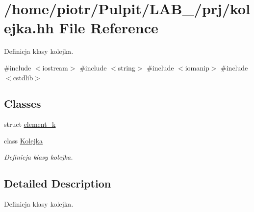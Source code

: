 \hypertarget{kolejka_8hh}{\section{/home/piotr/\-Pulpit/\-L\-A\-B\-\_/prj/kolejka.hh \-File \-Reference}
\label{kolejka_8hh}
}


\-Definicja klasy kolejka.  


{\ttfamily \#include $<$iostream$>$}\*
{\ttfamily \#include $<$string$>$}\*
{\ttfamily \#include $<$iomanip$>$}\*
{\ttfamily \#include $<$cstdlib$>$}\*
\subsection*{\-Classes}
\begin{DoxyCompactItemize}
\item 
struct \hyperlink{structelement__k}{element\-\_\-k}
\item 
class \hyperlink{class_kolejka}{\-Kolejka}
\begin{DoxyCompactList}\small\item\em \-Definicja klasy kolejka. \end{DoxyCompactList}\end{DoxyCompactItemize}


\subsection{\-Detailed \-Description}
\-Definicja klasy kolejka. 
